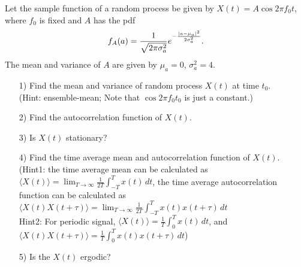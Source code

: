 \documentclass{assignment}
\begin{document}
\begin{prob}
    Let the sample function of a random process be given by $X(t)=A\cos 2\pi f_0t$, where $f_0$ is fixed and $A$ has the pdf
    \[
        f_A(a)=\frac{1}{\sqrt{2\pi\sigma_a^2}}e^{-\frac{\left\lvert a-\mu_a\right\rvert^2}{2\sigma_a^2}}.
    \]
    The mean and variance of $A$ are given by $\mu_a=0$, $\sigma_a^2=4$.
    \begin{itemize}
        \item[1)] Find the mean and variance of random process $X(t)$ at time $t_0$.\\
        (Hint: ensemble-mean; Note that $\cos 2\pi f_0t_0$ is just a constant.)
        \item[2)] Find the autocorrelation function of $X(t)$.
        \item[3)] Is $X(t)$ stationary?
        \item[4)] Find the time average mean and autocorrelation function of $X(t)$.\\
        (Hint1: the time average mean can be calculated as $\langle X(t)\rangle=\lim_{T\rightarrow\infty}\frac{1}{2T}\int_{-T}^Tx(t)\,dt$, the time average autocorrelation function can be calculated as $\langle X(t)X(t+\tau)\rangle=\lim_{T\rightarrow\infty}\frac{1}{2T}\int_{-T}^Tx(t)x(t+\tau)\,dt$\\
        Hint2: For periodic signal, $\langle X(t)\rangle=\frac{1}{T}\int_0^Tx(t)\,dt$, and $\langle X(t)X(t+\tau)\rangle=\frac{1}{T}\int_0^Tx(t)x(t+\tau)\,dt$)
        \item[5)] Is the $X(t)$ ergodic?
    \end{itemize}
\end{prob}
\end{document}
